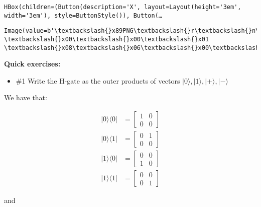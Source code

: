 \documentclass[11pt]{article}
\providecommand{\tightlist}{%
      \setlength{\itemsep}{0pt}\setlength{\parskip}{0pt}}
\begin{document}
    
    \begin{Verbatim}[commandchars=\\\{\}]
HBox(children=(Button(description='X', layout=Layout(height='3em', width='3em'), style=ButtonStyle()), Button(…
    \end{Verbatim}

    
    
    \begin{Verbatim}[commandchars=\\\{\}]
Image(value=b'\textbackslash{}x89PNG\textbackslash{}r\textbackslash{}n\textbackslash{}x1a\textbackslash{}n\textbackslash{}x00\textbackslash{}x00\textbackslash{}x00\textbackslash{}rIHDR\textbackslash{}x00\textbackslash{}x00\textbackslash{}x01 \textbackslash{}x00\textbackslash{}x00\textbackslash{}x01 \textbackslash{}x08\textbackslash{}x06\textbackslash{}x00\textbackslash{}x00\textbackslash{}x00\textbackslash{}x14\textbackslash{}x83\textbackslash{}xae\textbackslash{}x8…
    \end{Verbatim}

    
    \textbf{Quick exercises:}

\begin{itemize}
\tightlist
\item
  \#1 Write the H-gate as the outer products of vectors
  \(|0\rangle, |1\rangle, |+\rangle, |-\rangle\)
\end{itemize}

We have that:

\[
\begin{eqnarray}
|0\rangle \langle 0| &= 
\begin{bmatrix}
1 & 0 \\
0 & 0
\end{bmatrix}\\
|0\rangle \langle 1| &=
\begin{bmatrix}
0 & 1 \\
0 & 0
\end{bmatrix}\\
|1\rangle \langle 0| &= 
\begin{bmatrix}
0 & 0 \\
1 & 0
\end{bmatrix}\\
|1\rangle \langle 1| &= 
\begin{bmatrix}
0 & 0 \\
0 & 1
\end{bmatrix}
\end{eqnarray}
\]

and
\end{document}
